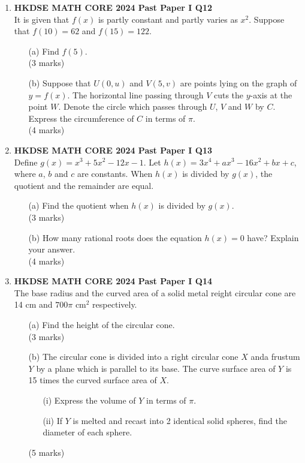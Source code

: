 \documentclass[12pt]{article}
\begin{document}
\begin{enumerate}
	\item \textbf{HKDSE MATH CORE 2024 Past Paper I Q12}\\
	It is given that $f(x)$ is partly constant and partly varies as $x^2$. Suppose that $f(10) = 62$ and $f(15) = 122$.
	\begin{enumerate}
		\item[(a)] Find $f(5)$. \\(3 marks)
		\item[(b)] Suppose that $U(0, u)$ and $V(5,v)$ are points lying on the graph of $y = f(x)$. The horizontal line passing through $V$ cuts the $y$-axis at the point $W$. Denote the circle which passes through $U$, $V$ and $W$ by $C$. Express the circumference of $C$ in terms of $\pi$. \\(4 marks)
	\end{enumerate}

	\item \textbf{HKDSE MATH CORE 2024 Past Paper I Q13}\\
	Define $g(x) = x^3 + 5x^2 - 12x - 1$. Let $h(x) = 3x^4 + ax^3 - 16x^2 + bx + c$, where $a$, $b$ and $c$ are constants. When $h(x)$ is divided by $g(x)$, the quotient and the remainder are equal.
	\begin{enumerate}
		\item[(a)] Find the quotient when $h(x)$ is divided by $g(x)$. \\(3 marks)
		\item[(b)] How many rational roots does the equation $h(x) = 0$ have? Explain your answer. \\(4 marks)
	\end{enumerate}

	\item \textbf{HKDSE MATH CORE 2024 Past Paper I Q14}\\
	The base radius and the curved area of a solid metal reight circular cone are 14 cm and $700\pi$ cm$^2$ respectively.
	\begin{enumerate}
		\item[(a)] Find the height of the circular cone. \\(3 marks)
		\item[(b)] The circular cone is divided into a right circular cone $X$ anda frustum $Y$ by a plane which is parallel to its base. The curve surface area of $Y$ is 15 times the curved surface area of $X$.
		\begin{enumerate}
			\item[(i)] Express the volume of $Y$ in terms of $\pi$.
			\item[(ii)] If $Y$ is melted and recast into 2 identical solid spheres, find the diameter of each sphere.
		\end{enumerate}
		(5 marks)
	\end{enumerate}


\end{enumerate}
\end{document}
